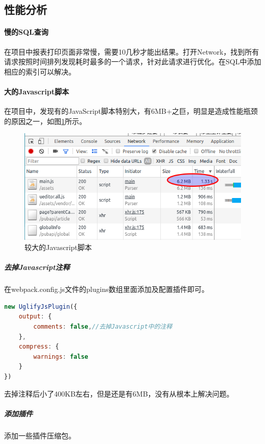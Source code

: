 \documentclass[letter]{book}
\begin{document}
\subsection{性能分析}

\paragraph{慢的SQL查询}

在项目中报表打印页面非常慢，需要10几秒才能出结果。打开Network，找到所有请求按照时间排列发现耗时最多的一个请求，针对此请求进行优化。在SQL中添加相应的索引可以解决。

\paragraph{大的Javascript脚本}在项目中，发现有的JavaScript脚本特别大，有6MB+之巨，明显是造成性能瓶颈的原因之一，如图\ref{fig:largejavasript}所示。

\begin{figure}[htbp]
	\centering
	\includegraphics[scale=0.5]{largejavasript.png}
	\caption{较大的Javascript脚本}
	\label{fig:largejavasript}
\end{figure}

\subparagraph{去掉Javascript注释}

在webpack.config.js文件的plugins数组里面添加及配置插件即可。

\begin{lstlisting}[language=Javascript]
new UglifyJsPlugin({
	output: {
		comments: false,//去掉Javascript中的注释
	},
	compress: {
		warnings: false
	}
})
\end{lstlisting}

去掉注释后小了400KB左右，但是还是有6MB，没有从根本上解决问题。

\subparagraph{添加插件}

添加一些插件压缩包。
\end{document}
